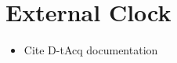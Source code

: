 \chapter{External Clock}
\label{app:ExternalClock}

\begin{itemize}
  \item Cite D-tAcq documentation
\end{itemize}

% 
% 
% 
% 
% 
% 
% 
